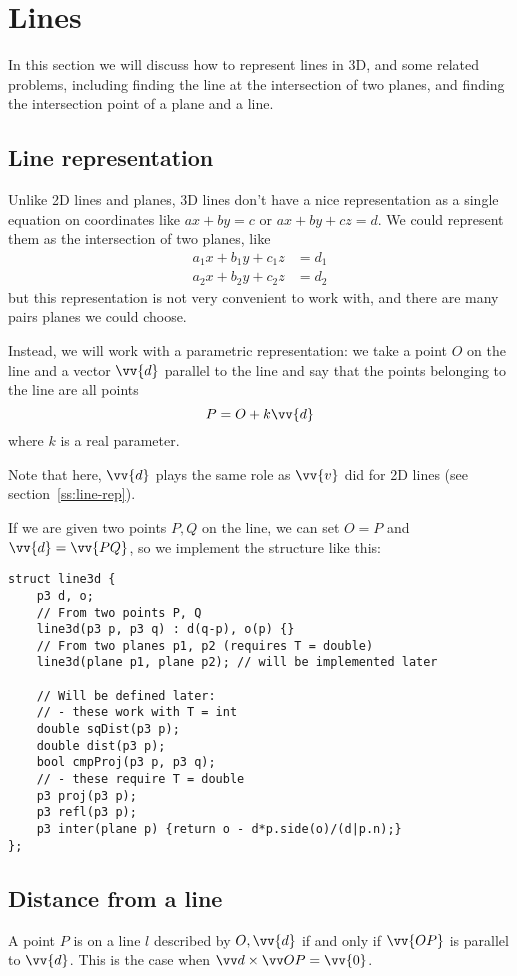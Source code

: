 \section{Lines}
In this section we will discuss how to represent lines in 3D, and some related problems, including finding the line at the intersection of two planes, and finding the intersection point of a plane and a line.

\subsection{Line representation}
Unlike 2D lines and planes, 3D lines don't have a nice representation as a single equation on coordinates like $ax+by=c$ or $ax+by+cz=d$. We could represent them as the intersection of two planes, like
\begin{align*}
a_1x+b_1y+c_1z &= d_1 \\
a_2x+b_2y+c_2z &= d_2
\end{align*}
but this representation is not very convenient to work with, and there are many pairs planes we could choose.


Instead, we will work with a parametric representation: we take a point $O$ on the line and a vector $\vv{d}$ parallel to the line and say that the points belonging to the line are all points
\[P = O + k \vv{d}\]
where $k$ is a real parameter.


Note that here, $\vv{d}$ plays the same role as $\vv{v}$ did for 2D lines (see section~\ref{ss:line-rep}).

If we are given two points $P,Q$ on the line, we can set $O=P$ and $\vv{d}=\vv{PQ}$, so we implement the structure like this:
\begin{lstlisting}
struct line3d {
    p3 d, o;
    // From two points P, Q
    line3d(p3 p, p3 q) : d(q-p), o(p) {}
    // From two planes p1, p2 (requires T = double)
    line3d(plane p1, plane p2); // will be implemented later
    
    // Will be defined later:
    // - these work with T = int
    double sqDist(p3 p);
    double dist(p3 p);
    bool cmpProj(p3 p, p3 q);
    // - these require T = double
    p3 proj(p3 p);
    p3 refl(p3 p);
    p3 inter(plane p) {return o - d*p.side(o)/(d|p.n);}
};
\end{lstlisting}

\subsection{Distance from a line}
A point $P$ is on a line $l$ described by $O,\vv{d}$ if and only if $\vv{OP}$ is parallel to $\vv{d}$. This is the case when $\crossv{d}{OP} = \vv{0}$.

